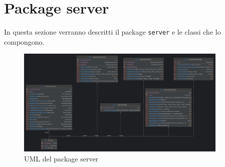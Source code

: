 \section{Package server}
In questa sezione verranno descritti il package \texttt{server} e le classi che lo compongono.\\

\begin{figure}[H]
      \centering
      \includegraphics[width=0.9\textwidth]{img/serverPackage.png}
      \caption{UML del package server}
      \label{fig:Server}
\end{figure}

